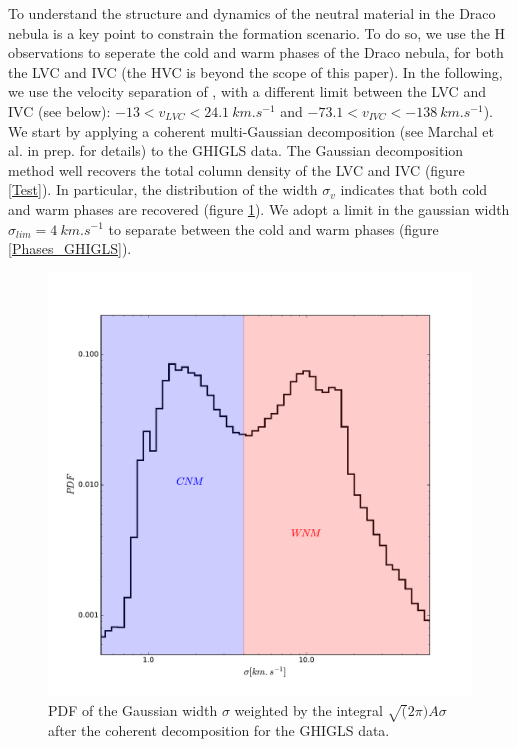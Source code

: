 \documentclass[traditabstract]{aa}
\begin{document}
   To understand the structure and dynamics of the neutral material in the Draco nebula is a key point to constrain the formation scenario. To do so, we use the H observations to seperate the cold and warm phases of the Draco nebula, for both the LVC and IVC (the HVC is beyond the scope of this paper). In the following, we use the velocity separation of \cite{Planck_XXIV_2011}, with a different limit between the LVC and IVC (see below): $-13<v_{LVC}<24.1\: km.s^{-1}$ and $-73.1<v_{IVC}<-138\: km.s^{-1}$).
We start by applying a coherent multi-Gaussian decomposition (see Marchal et al. in prep. for details) to the GHIGLS data. The Gaussian decomposition method well recovers the total column density of the LVC and IVC (figure \ref{Test}). In particular, the distribution of the width $\sigma_v$ indicates that both cold and warm phases are recovered (figure \ref{PDF_sigma}). We adopt a limit in the gaussian width $\sigma_{lim}=4\: km.s^{-1}$ to separate between the
cold and warm phases (figure \ref{Phases_GHIGLS}).

\begin{figure}
  \centering
  \includegraphics[width=\linewidth,trim=30 30 70 70,clip=true]{Figures/PDF_sigma_over_A.pdf}
  \caption{\label{PDF_sigma} PDF of the Gaussian width $\sigma$ weighted by the integral $\sqrt(2\pi)A\sigma$ after the coherent decomposition for the GHIGLS data.}
\end{figure}
\end{document}
